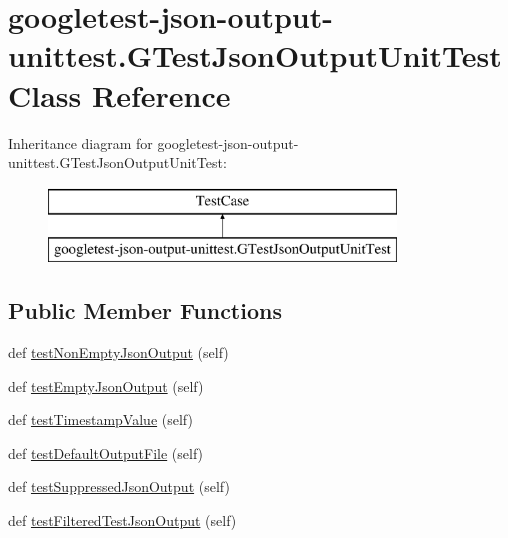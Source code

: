 \hypertarget{classgoogletest-json-output-unittest_1_1_g_test_json_output_unit_test}{}\section{googletest-\/json-\/output-\/unittest.G\+Test\+Json\+Output\+Unit\+Test Class Reference}
\label{classgoogletest-json-output-unittest_1_1_g_test_json_output_unit_test}
Inheritance diagram for googletest-\/json-\/output-\/unittest.G\+Test\+Json\+Output\+Unit\+Test\+:\begin{figure}[H]
\begin{center}
\leavevmode
\includegraphics[height=2.000000cm]{classgoogletest-json-output-unittest_1_1_g_test_json_output_unit_test}
\end{center}
\end{figure}
\subsection*{Public Member Functions}
\begin{DoxyCompactItemize}
\item 
def \mbox{\hyperlink{classgoogletest-json-output-unittest_1_1_g_test_json_output_unit_test_ab5520f22133356e62a54cdb5756504bc}{test\+Non\+Empty\+Json\+Output}} (self)
\item 
def \mbox{\hyperlink{classgoogletest-json-output-unittest_1_1_g_test_json_output_unit_test_ad8f3712a87e4c54bb475103793975482}{test\+Empty\+Json\+Output}} (self)
\item 
def \mbox{\hyperlink{classgoogletest-json-output-unittest_1_1_g_test_json_output_unit_test_afceaa6545170996b286e610e31f2e403}{test\+Timestamp\+Value}} (self)
\item 
def \mbox{\hyperlink{classgoogletest-json-output-unittest_1_1_g_test_json_output_unit_test_a6003d1c583fc2ded1ab5276fc82cb1c9}{test\+Default\+Output\+File}} (self)
\item 
def \mbox{\hyperlink{classgoogletest-json-output-unittest_1_1_g_test_json_output_unit_test_aeae00520b90ff69e832cf6a676219cf8}{test\+Suppressed\+Json\+Output}} (self)
\item 
def \mbox{\hyperlink{classgoogletest-json-output-unittest_1_1_g_test_json_output_unit_test_abc55ae0ca4d9b3d265b10bbbcc6e720e}{test\+Filtered\+Test\+Json\+Output}} (self)
\end{DoxyCompactItemize}

